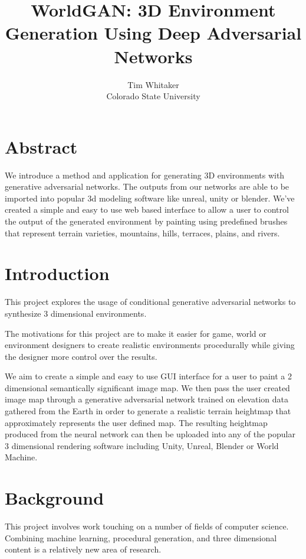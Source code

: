 \documentclass[twocolumn]{article}
\title{WorldGAN: 3D Environment Generation Using Deep Adversarial Networks}
\author{Tim Whitaker \\ Colorado State University}
\begin{document}
	\maketitle
	
	\section{Abstract}
	
	We introduce a method and application for generating 3D environments with generative adversarial networks. The outputs from our networks are able to be imported into popular 3d modeling software like unreal, unity or blender. We've created a simple and easy to use web based interface to allow a user to control the output of the generated environment by painting using predefined brushes that represent terrain varieties, mountains, hills, terraces, plains, and rivers.
	
	\section{Introduction}

	This project explores the usage of conditional generative adversarial networks to synthesize 3 dimensional environments.
	
	The motivations for this project are to make it easier for game, world or environment designers to create realistic environments procedurally while giving the designer more control over the results.
	
	We aim to create a simple and easy to use GUI interface for a user to paint a 2 dimensional semantically significant image map. We then pass the user created image map through a generative adversarial network trained on elevation data gathered from the Earth in order to generate a realistic terrain heightmap that approximately represents the user defined map. The resulting heightmap produced from the neural network can then be uploaded into any of the popular 3 dimensional rendering software including Unity, Unreal, Blender or World Machine.
	
	\section{Background}
	
	This project involves work touching on a number of fields of computer science. Combining machine learning, procedural generation, and three dimensional content is a relatively new area of research. 
	
\end{document}
